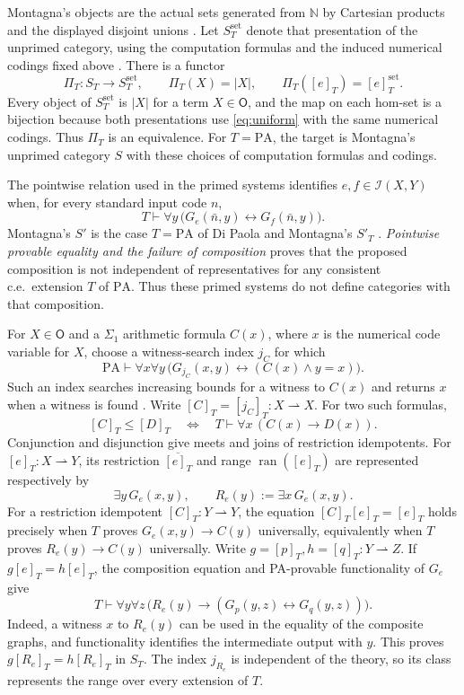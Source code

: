 \documentclass[11pt]{article}
\newcommand{\N}{\mathbb N}
\newcommand{\PA}{\mathrm{PA}}
\newcommand{\ran}{\operatorname{ran}}
\begin{document}
Montagna's objects are the actual sets generated from $\N$ by
Cartesian products and the displayed disjoint unions
\cite[p.~105]{Montagna}. Let $S_T^{\mathrm{set}}$ denote that
presentation of the unprimed category, using the computation
formulas and the induced numerical codings fixed above
\cite{Montagna,DPM}. There is a functor
\[
 \Pi_T:S_T\longrightarrow S_T^{\mathrm{set}},\qquad
 \Pi_T(X)=|X|,\qquad \Pi_T([e]_T)=[e]_T^{\mathrm{set}}.
\]
Every object of $S_T^{\mathrm{set}}$ is $|X|$ for a term
$X\in\mathsf O$, and the map on each hom-set is a bijection
because both presentations use \eqref{eq:uniform} with the same
numerical codings. Thus $\Pi_T$ is an equivalence. For $T=\PA$,
the target is Montagna's unprimed category $S$ with these choices
of computation formulas and codings.

The pointwise relation used in the primed systems identifies
$e,f\in\mathcal I(X,Y)$ when, for every standard input code $n$,
\[
 T\vdash\forall y\,
   \bigl(G_e(\bar n,y)\leftrightarrow G_f(\bar n,y)\bigr).
\]
Montagna's $S'$ is the case
$T=\PA$ of Di Paola and Montagna's $S'_T$ \cite{Montagna,DPM}.
\emph{Pointwise provable equality and the failure of composition}
\cite[Corollary 2]{Composition} proves that the proposed composition
is not independent of representatives for any consistent c.e.\
extension $T$ of $\PA$. Thus these primed systems do not define
categories with that composition.

For $X\in\mathsf O$ and a $\Sigma_1$ arithmetic formula $C(x)$,
where $x$ is the numerical code variable for $X$, choose
a witness-search index $j_C$ for which
\[
 \PA\vdash\forall x\forall y\,
 \bigl(G_{j_C}(x,y)\leftrightarrow(C(x)\land y=x)\bigr).
\]
Such an index searches increasing bounds for a witness to $C(x)$
and returns $x$ when a witness is found
\cite[p.~109, equation~$(*)$]{Montagna}. Write
$[C]_T=[j_C]_T:X\rightharpoonup X$.
For two such formulas,
\begin{equation}\label{eq:domain-order}
 [C]_T\le[D]_T
 \quad\Longleftrightarrow\quad
 T\vdash\forall x\,(C(x)\longrightarrow D(x)).
\end{equation}
Conjunction and disjunction give meets and joins of restriction
idempotents. For $[e]_T:X\rightharpoonup Y$, its restriction
$\overline{[e]_T}$ and range $\ran([e]_T)$ are represented respectively by
\[
 \exists y\,G_e(x,y),\qquad
 R_e(y):=\exists x\,G_e(x,y).
\]
For a restriction idempotent $[C]_T:Y\rightharpoonup Y$, the
equation $[C]_T[e]_T=[e]_T$ holds precisely when
$T$ proves $G_e(x,y)\to C(y)$ universally, equivalently when
$T$ proves $R_e(y)\to C(y)$ universally.
Write $g=[p]_T,h=[q]_T:Y\rightharpoonup Z$.
If $g[e]_T=h[e]_T$, the
composition equation and PA-provable functionality of $G_e$ give
\[
 T\vdash\forall y\forall z\,
 \bigl(R_e(y)\longrightarrow
       (G_p(y,z)\leftrightarrow G_q(y,z))\bigr).
\]
Indeed, a witness $x$ to $R_e(y)$ can be used in the equality of
the composite graphs, and functionality identifies the intermediate
output with $y$. This proves $g[R_e]_T=h[R_e]_T$ in $S_T$.
The index $j_{R_e}$ is independent of the theory, so its class
represents the range over every extension of $T$.
\end{document}

